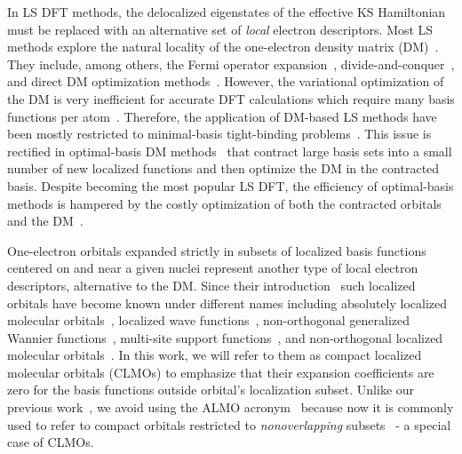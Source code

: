 \documentclass[aps,prl,twocolumn,reprint,amsmath,amssymb]{revtex4-1}
\begin{document}
In LS DFT methods, the delocalized eigenstates of the effective KS Hamiltonian must be replaced with an alternative set of \emph{local} electron descriptors. 
Most LS methods explore the natural locality of the one-electron density matrix (DM)~\cite{li1993density, lee1996linear, li2003density, shao2003curvy, vandevondele2012linear, kussmann2013linear, aarons2016perspective}.  
They include, among others, the Fermi operator expansion~\cite{goedecker1994efficient, goedecker1995tight}, divide-and-conquer~\cite{yang1991direct, yang1991local}, and direct DM optimization methods~\cite{li1993density, shao2003curvy, vandevondele2012linear}. 
However, the variational optimization of the DM is very inefficient for accurate DFT calculations which require many basis functions per atom~\cite{goedecker1999linear,vandevondele2012linear, arita2014stable, bowler2012methods, khaliullin2013efficient}.
Therefore, the application of DM-based LS methods have been mostly restricted to minimal-basis tight-binding problems~\cite{Richters2014, goringe1997tight, ratcliff2018band}. 
This issue is rectified in optimal-basis DM methods~\cite{skylaris2005introducing, nakata2015optimized, mohr2015accurate} that contract large basis sets into a small number of new localized functions and then optimize the DM in the contracted basis. 
Despite becoming the most popular LS DFT, the efficiency of optimal-basis methods is hampered by the costly optimization of both the contracted orbitals and the DM~\cite{mostofi2003preconditioned}.

One-electron orbitals expanded strictly in subsets of localized basis functions centered on and near a given nuclei 
represent another type of local electron descriptors, alternative to the DM. 
Since their introduction~\cite{matsuoka1977expansion, stoll1977on, mehler1977self} such localized orbitals have become known under different names including absolutely localized molecular orbitals~\cite{stoll1980use}, localized wave functions~\cite{ordejon1995linear}, non-orthogonal generalized Wannier functions~\cite{skylaris2005introducing}, multi-site support functions~\cite{nakata2015optimized}, and non-orthogonal localized molecular orbitals~\cite{burger2008linear}. 
In this work, we will refer to them as compact localized molecular orbitals (CLMOs) to emphasize that their expansion coefficients are zero for the basis functions outside orbital's localization subset. Unlike our previous work~\cite{khaliullin2013efficient}, we avoid using the ALMO acronym~\cite{stoll1980use} because now it is commonly used to refer to compact orbitals restricted to \emph{nonoverlapping} subsets~\cite{khaliullin2006efficient, khaliullin2007unravelling, khaliullin2008analysis, horn2013unrestricted} - a special case of CLMOs. 
\end{document}
